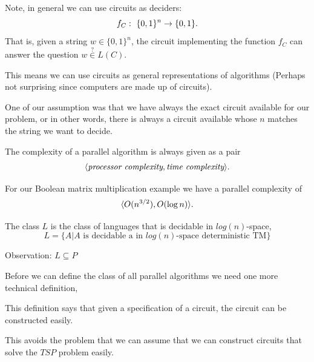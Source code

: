 \documentclass[a4paper,blends,pdf,colorBG,slideColor]{prosper}
\begin{document}
{\small
Note, in general we can use circuits as deciders: \[f_C\,\colon\; \{0,1\}^n \rightarrow \{0,1\}.\]
That is, given a string $w \in \{0,1\}^n$, the circuit implementing the function $f_C$
can answer the question $w \stackrel{?}{\in} L(C)$.

This means we can use circuits as general representations of algorithms (Perhaps not surprising since computers are made up of circuits).

One of our assumption was that we have always the exact circuit available for our problem, or in other words, there is always a circuit available whose $n$ matches the string we want to decide.

}
\es



The complexity of a parallel algorithm is always given as a pair \[\langle {\mbox{\em processor complexity}, \mbox{\em time complexity}} \rangle.\]

For our Boolean matrix multiplication example we have a parallel complexity of 
\[\langle {O(n^{3/2}), O(\log n)} \rangle.\]
\es



The class $L$ is the class of languages that is decidable in $log(n)$-space,
\[
L = \{ A | \mbox{$A$ is decidable a in $log(n)$-space deterministic TM}\}
\]

Observation: $ L \subseteq P$
\es

Before we can define the class of all parallel algorithms we need one more technical definition,

This definition says that given a specification of a circuit, the circuit can be constructed easily. 

This avoids the problem that we can assume that we can construct circuits that solve the $TSP$ problem easily.
\end{document}
